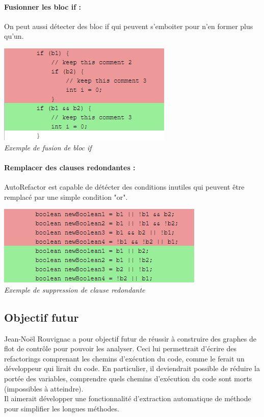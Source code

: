 \documentclass[a4paper,twoside,12pt,openright]{report}
\begin{document}
\paragraph{Fusionner les bloc if :}
On peut aussi détecter des bloc if qui peuvent s'emboiter pour n'en former plus qu'un.

\begin{center}
\includegraphics[scale=1]{Image/FusionIf.png}\\
\itshape{Exemple de fusion de bloc if \cite{ref10}}
\end{center}

\paragraph{Remplacer des clauses redondantes :}
AutoRefactor est capable de détécter des conditions inutiles qui peuvent être remplacé par une simple condition "or".

\begin{center}
\includegraphics[scale=1]{Image/ClauseRedondante.png}\\
\itshape{Exemple de suppression de clause redondante\cite{ref10}}
\end{center}


\subsection{Objectif futur}
Jean-Noël Rouvignac a pour objectif futur de réussir à construire des graphes de flot de contrôle pour pouvoir les analyser. Ceci lui permettrait d'écrire des refactorings comprenant les chemins d'exécution du code, comme le ferait un développeur qui lirait du code. En particulier, il deviendrait possible de réduire la portée des variables, comprendre quels chemins d'exécution du code sont morts (impossibles à atteindre).\cite{ref7}\\
Il aimerait développer une fonctionnalité d'extraction automatique de méthode pour simplifier les longues méthodes.\\
\end{document}
